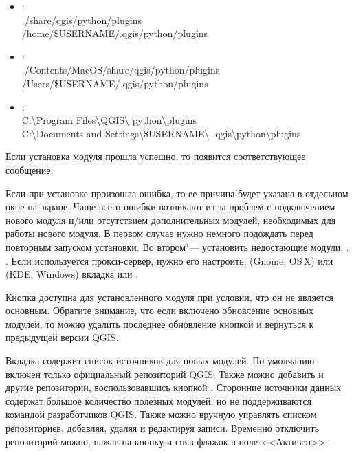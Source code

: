 \begin{itemize}[label=--]
\item {}:\\
./share/qgis/python/plugins \\
/home/\$USERNAME/.qgis/python/plugins
\item {}:\\
./Contents/MacOS/share/qgis/python/plugins \\
/Users/\$USERNAME/.qgis/python/plugins
\item {}:\\
C:\textbackslash Program Files\textbackslash QGIS\textbackslash
python\textbackslash plugins \\
C:\textbackslash Documents and Settings\textbackslash\$USERNAME\textbackslash
.qgis\textbackslash python\textbackslash plugins
\end{itemize}

Если установка модуля прошла успешно, то появится соответствующее
сообщение.

Если при установке произошла ошибка, то ее причина будет указана в
отдельном окне на экране. Чаще всего ошибки возникают из-за проблем с
подключением нового модуля и/или отсутствием дополнительных модулей,
необходимых для работы нового модуля. В первом случае нужно немного
подождать перед повторным запуском установки. Во втором"--- установить
недостающие модули.
.
.
Если используется прокси-сервер, нужно его настроить:
 \arrow {} (Gnome, OS\,X)
или  \arrow {} (KDE, Windows)
вкладка  или .

Кнопка  доступна для установленного модуля при
условии, что он не является основным. Обратите внимание, что если
включено обновление основных модулей, то можно удалить последнее
обновление кнопкой   и вернуться к предыдущей
версии QGIS.


Вкладка  содержит список источников для новых модулей.
По умолчанию включен только официальный репозиторий QGIS. Также можно
добавить и другие репозитории, воспользовавшись кнопкой
. Сторонние источники данных
содержат большое количество полезных модулей, но не поддерживаются
командой разработчиков QGIS. Также можно вручную управлять списком
репозиториев, добавляя, удаляя и редактируя записи. Временно отключить
репозиторий можно, нажав на кнопку  и сняв флажок
в поле <<Активен>>.

